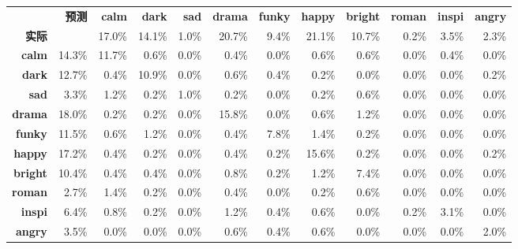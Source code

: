 \documentclass[a4paper,utf8,10pt]{article}
\begin{document}
\begin{center}

 \label{tab:moodcm}
\begin{tabular}{ | r r | r | r | r | r | r | r | r | r | r | r | }
\hline
 & \bf 预测 & \bf calm & \bf dark & \bf sad & \bf drama & \bf funky & \bf happy & \bf bright & \bf roman & \bf inspi & \bf angry \\
\bf 实际 & & 17.0\% & 14.1\% & 1.0\% & 20.7\% & 9.4\% & 21.1\% & 10.7\% & 0.2\% & 3.5\% & 2.3\% \\\hline
\bf calm & 14.3\% & 11.7\% & 0.6\% & 0.0\% & 0.4\% & 0.0\% & 0.6\% & 0.6\% & 0.0\% & 0.4\% & 0.0\% \\\hline
\bf dark & 12.7\% & 0.4\% & 10.9\% & 0.0\% & 0.6\% & 0.4\% & 0.2\% & 0.0\% & 0.0\% & 0.0\% & 0.2\% \\\hline
\bf sad & 3.3\% & 1.2\% & 0.2\% & 1.0\% & 0.2\% & 0.0\% & 0.2\% & 0.6\% & 0.0\% & 0.0\% & 0.0\% \\\hline
\bf drama & 18.0\% & 0.2\% & 0.2\% & 0.0\% & 15.8\% & 0.0\% & 0.6\% & 1.2\% & 0.0\% & 0.0\% & 0.0\% \\\hline
\bf funky & 11.5\% & 0.6\% & 1.2\% & 0.0\% & 0.4\% & 7.8\% & 1.4\% & 0.2\% & 0.0\% & 0.0\% & 0.0\% \\\hline
\bf happy & 17.2\% & 0.4\% & 0.2\% & 0.0\% & 0.4\% & 0.2\% & 15.6\% & 0.2\% & 0.0\% & 0.0\% & 0.2\% \\\hline
\bf bright & 10.4\% & 0.4\% & 0.4\% & 0.0\% & 0.8\% & 0.2\% & 1.2\% & 7.4\% & 0.0\% & 0.0\% & 0.0\% \\\hline
\bf roman & 2.7\% & 1.4\% & 0.2\% & 0.0\% & 0.4\% & 0.0\% & 0.2\% & 0.6\% & 0.0\% & 0.0\% & 0.0\% \\\hline
\bf inspi & 6.4\% & 0.8\% & 0.2\% & 0.0\% & 1.2\% & 0.4\% & 0.6\% & 0.0\% & 0.2\% & 3.1\% & 0.0\% \\\hline
\bf angry & 3.5\% & 0.0\% & 0.0\% & 0.0\% & 0.6\% & 0.4\% & 0.6\% & 0.0\% & 0.0\% & 0.0\% & 2.0\% \\\hline
\end{tabular}


\end{center}
\end{document}
